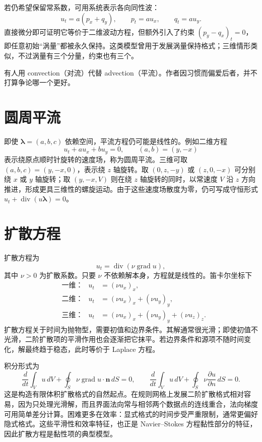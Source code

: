 \documentclass[11pt,a4paper,openany,fontset=none]{ctexbook}
\begin{document}
若仍希望保留常系数，可用系统表示各向同性波：
\begin{equation}
 u_t=a(p_x+q_y),\qquad p_t=a u_x,\qquad q_t=a u_y. \tag{2.1.13--15}
\end{equation}
直接微分即可证明它等价于二维波动方程，但额外引入了约束 $(p_y-q_x)_t=0$，即任意初始“涡量”都被永久保持。这类模型曾用于发展涡量保持格式；三维情形类似，不过涡量有三个分量，约束也有三个。

有人用 convection（对流）代替 advection（平流）。作者因习惯而偏爱后者，并不打算争论哪一个更好。

\section{圆周平流}

即使 $\bm\lambda=(a,b,c)$ 依赖空间，平流方程仍可能是线性的。例如二维方程
\begin{equation}
 u_t+a u_x+b u_y=0,\qquad (a,b)=(y,-x) \tag{2.2.1--2}
\end{equation}
表示绕原点顺时针旋转的速度场，称为圆周平流。三维可取 $(a,b,c)=(y,-x,0)$，表示绕 $z$ 轴旋转。取 $(0,z,-y)$ 或 $(z,0,-x)$ 可分别绕 $x$ 或 $y$ 轴旋转；取 $(y,-x,V)$ 则在绕 $z$ 轴旋转的同时，以常速度 $V$ 沿 $z$ 方向推进，形成更具三维性的螺旋运动。由于这些速度场散度为零，仍可写成守恒形式 $u_t+\operatorname{div}(u\bm\lambda)=0$。

\section{扩散方程}

扩散方程为
\begin{equation}
 u_t=\operatorname{div}(\nu\operatorname{grad}u), \tag{2.3.1}
\end{equation}
其中 $\nu>0$ 为扩散系数。只要 $\nu$ 不依赖解本身，方程就是线性的。笛卡尔坐标下
\begin{align}
 &\text{一维：}&u_t&=(\nu u_x)_x, \tag{2.3.2}\\
 &\text{二维：}&u_t&=(\nu u_x)_x+(\nu u_y)_y, \tag{2.3.3}\\
 &\text{三维：}&u_t&=(\nu u_x)_x+(\nu u_y)_y+(\nu u_z)_z. \tag{2.3.4}
\end{align}
扩散方程关于时间为抛物型，需要初值和边界条件。其解通常很光滑；即使初值不光滑，二阶扩散项的平滑作用也会逐渐把它抹平。若边界条件和源项不随时间变化，解最终趋于稳态，此时等价于 Laplace 方程。

积分形式为
\begin{equation}
 \frac{d}{dt}\int_Vu\,dV+\oint_S\nu\operatorname{grad}u\cdot\bm n\,dS=0,
 \qquad
 \frac{d}{dt}\int_Vu\,dV+\oint_S\nu\frac{\partial u}{\partial n}\,dS=0. \tag{2.3.5--6}
\end{equation}
这是构造有限体积扩散格式的自然起点。在规则网格上发展二阶扩散格式相对容易，因为只处理光滑解，而且界面法向常与相邻两个数据点的连线重合，法向梯度可用简单差分计算。困难更多在效率：显式格式的时间步受严重限制，通常更偏好隐式格式。这些平滑性和效率特征，也正是 Navier--Stokes 方程黏性部分的特征，因此扩散方程是黏性项的典型模型。
\end{document}
